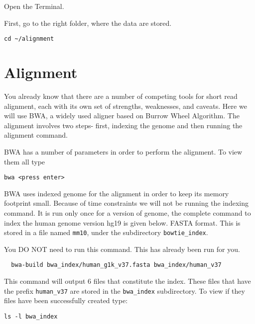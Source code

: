 \begin{steps}
Open the Terminal.

First, go to the right folder, where the data are stored.
\begin{lstlisting}
cd ~/alignment
\end{lstlisting}

\end{steps}

\section{Alignment}

\begin{information}
You already know that there are a number of competing tools for short read alignment, each with its own set of strengths, weaknesses, and caveats. Here we will use BWA, a widely used aligner based on Burrow Wheel Algorithm.  The alignment involves two steps- first, indexing the genome and then running the alignment command.  
\end{information}

\begin{steps}
BWA has a number of parameters in order to perform the alignment. To view them all type

\begin{lstlisting}
bwa <press enter> 
\end{lstlisting}

BWA uses indexed genome for the alignment in order to keep its memory footprint small. Because of time constraints we will not be running the indexing command. It is run only once for a version of genome, the complete command to index the human genome version hg19 is given below. 
FASTA format. This is stored in a file named \texttt{mm10}, under the
subdirectory \texttt{bowtie\_index}.

\begin{warning}
  You DO NOT need to run this command. This has already been run for you.
  \begin{lstlisting}
  bwa-build bwa_index/human_g1k_v37.fasta bwa_index/human_v37
  \end{lstlisting}
\end{warning}

This command will output 6 files that constitute the index. These files that have the prefix \texttt{human_v37} are stored in the \texttt{bwa\_index} subdirectory. To view if they files have been successfully created type:

\begin{lstlisting}
ls -l bwa_index
\end{lstlisting}
\end{steps}

